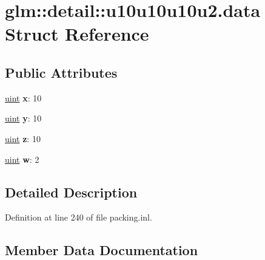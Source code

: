 \hypertarget{structglm_1_1detail_1_1u10u10u10u2_8data}{}\section{glm\+:\+:detail\+:\+:u10u10u10u2.\+data Struct Reference}
\label{structglm_1_1detail_1_1u10u10u10u2_8data}
\subsection*{Public Attributes}
\begin{DoxyCompactItemize}
\item 
\mbox{\label{structglm_1_1detail_1_1u10u10u10u2_8data_a9dd4e461268c8034f5c8564e155c67a6}} 
\hyperlink{group__core__precision_ga4fd29415871152bfb5abd588334147c8}{uint} {\bfseries x}\+: 10
\item 
\mbox{\label{structglm_1_1detail_1_1u10u10u10u2_8data_a415290769594460e2e485922904f345d}} 
\hyperlink{group__core__precision_ga4fd29415871152bfb5abd588334147c8}{uint} {\bfseries y}\+: 10
\item 
\mbox{\label{structglm_1_1detail_1_1u10u10u10u2_8data_afbade9e36a3f36d3d676c1b808451dd7}} 
\hyperlink{group__core__precision_ga4fd29415871152bfb5abd588334147c8}{uint} {\bfseries z}\+: 10
\item 
\mbox{\label{structglm_1_1detail_1_1u10u10u10u2_8data_af1290186a5d0b1ceab27f4e77c0c5d68}} 
\hyperlink{group__core__precision_ga4fd29415871152bfb5abd588334147c8}{uint} {\bfseries w}\+: 2
\end{DoxyCompactItemize}


\subsection{Detailed Description}


Definition at line 240 of file packing.\+inl.



\subsection{Member Data Documentation}
\mbox{\label{structglm_1_1detail_1_1u10u10u10u2_8data_af1290186a5d0b1ceab27f4e77c0c5d68}} 
